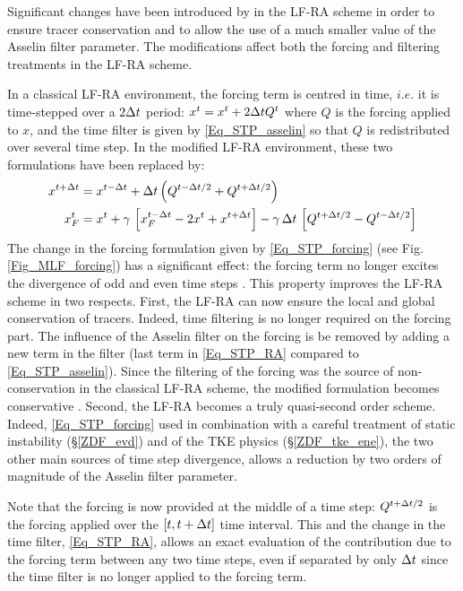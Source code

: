 Significant changes have been introduced by \cite{Leclair_Madec_OM09} in the 
LF-RA scheme in order to ensure tracer conservation and to allow the use of 
a much smaller value of the Asselin filter parameter. The modifications affect 
both the forcing and filtering treatments in the LF-RA scheme.

In a classical LF-RA environment, the forcing term is centred in time, $i.e.$ 
it is time-stepped over a $2\Delta t$ period:  $x^t  = x^t + 2\Delta t Q^t $ where $Q$ 
is the forcing applied to $x$, and the time filter is given by \eqref{Eq_STP_asselin} 
so that $Q$ is redistributed over several time step. 
In the modified LF-RA environment, these two formulations have been replaced by:
\begin{align} 
x^{t+\rdt}  &= x^{t-\rdt} + \rdt \left( Q^{t-\rdt/2} + Q^{t+\rdt/2} \right)                   \label{Eq_STP_forcing} \\
%
x_F^t  &= x^t + \gamma \, \left[ x_F^{t-\rdt} - 2 x^t + x^{t+\rdt} \right] 
           - \gamma\,\rdt \, \left[ Q^{t+\rdt/2} -  Q^{t-\rdt/2} \right]                          \label{Eq_STP_RA}
\end{align}
The change in the forcing formulation given by \eqref{Eq_STP_forcing} 
(see Fig.\ref{Fig_MLF_forcing}) has a significant effect: the forcing term no 
longer excites the divergence of odd and even time steps \citep{Leclair_Madec_OM09}. 
This property improves the LF-RA scheme in two respects. 
First, the LF-RA can now ensure the local and global conservation of tracers.
Indeed, time filtering is no longer required on the forcing part. The influence of 
the Asselin filter on the forcing is be removed by adding a new term in the filter
(last term in \eqref{Eq_STP_RA} compared to \eqref{Eq_STP_asselin}). Since 
the filtering of the forcing was the source of non-conservation in the classical 
LF-RA scheme, the modified formulation becomes conservative  \citep{Leclair_Madec_OM09}.
Second, the LF-RA becomes a truly quasi-second order scheme. Indeed, 
\eqref{Eq_STP_forcing} used in combination with a careful treatment of static 
instability (\S\ref{ZDF_evd}) and of the TKE physics (\S\ref{ZDF_tke_ene}),
the two other main sources of time step divergence, allows a reduction by 
two orders of magnitude of the Asselin filter parameter. 

Note that the forcing is now provided at the middle of a time step: $Q^{t+\Delta t/2}$ 
is the forcing applied over the $[t,t+\Delta t]$ time interval. This and the change 
in the time filter, \eqref{Eq_STP_RA}, allows an exact evaluation of the 
contribution due to the forcing term between any two time steps, 
even if separated by only $\Delta t$ since the time filter is no longer applied to the
forcing term.

